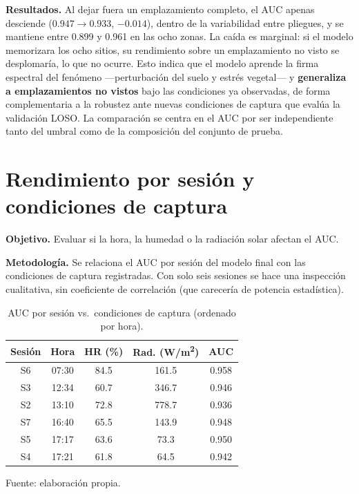 \textbf{Resultados.} Al dejar fuera un emplazamiento completo, el \ac{AUC} apenas
desciende ($0.947 \to 0.933$, $-0.014$), dentro de la variabilidad entre pliegues,
y se mantiene entre 0.899 y 0.961 en las ocho zonas. La caída es marginal: si el
modelo memorizara los ocho sitios, su rendimiento sobre un emplazamiento no visto se
desplomaría, lo que no ocurre. Esto indica que el modelo aprende la firma espectral
del fenómeno ---perturbación del suelo y estrés vegetal--- y \textbf{generaliza a emplazamientos no vistos} bajo las condiciones ya
observadas, de forma complementaria a la robustez ante nuevas condiciones de
captura que evalúa la validación \ac{LOSO}. La comparación se centra en el \ac{AUC} por ser independiente tanto del umbral como de la composición del conjunto de prueba.

\section{Rendimiento por sesión y condiciones de captura}
\label{sec:condiciones}

\textbf{Objetivo.} Evaluar si la hora, la humedad o la radiación solar afectan el
\ac{AUC}.

\textbf{Metodología.} Se relaciona el \ac{AUC} por sesión del modelo final con las
condiciones de captura registradas. Con solo seis sesiones se hace una inspección
cualitativa, sin coeficiente de correlación (que carecería de potencia estadística).

\begin{table}[H]
\centering
\caption{\ac{AUC} por sesión vs.\ condiciones de captura (ordenado por hora).}
\label{tab:condiciones}
\small
\begin{tabular}{ccccc}
\toprule
\textbf{Sesión} & \textbf{Hora} & \textbf{HR (\%)} &
\textbf{Rad. (W/m\textsuperscript{2})} & \textbf{AUC} \\
\midrule
S6 & 07:30 & 84.5 & 161.5 & 0.958 \\
S3 & 12:34 & 60.7 & 346.7 & 0.946 \\
S2 & 13:10 & 72.8 & 778.7 & 0.936 \\
S7 & 16:40 & 65.5 & 143.9 & 0.948 \\
S5 & 17:17 & 63.6 & 73.3  & 0.950 \\
S4 & 17:21 & 61.8 & 64.5  & 0.942 \\
\bottomrule
\end{tabular}

  {\footnotesize Fuente: elaboración propia.}
\end{table}

